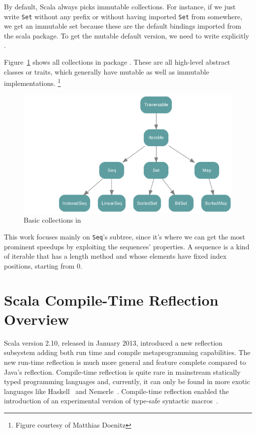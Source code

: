 By default, Scala always picks immutable collections. For instance, if we just
write \texttt{Set} without any prefix or without having imported \texttt{Set} from somewhere, we
get an immutable set because these are the default bindings imported from the scala
package. To get the mutable default version, we need to write explicitly
.

Figure~\ref{colls} shows all collections in package . These
are all high-level abstract classes or traits, which generally have mutable as
well as immutable implementations. \footnote{Figure courtesy of Matthias Doenitz}

\begin{figure}
\centering
\includegraphics{figures/colls.png}
\caption[All  collections]{Basic collections in 
}
\label{colls}
\end{figure}


This work focuses mainly on \texttt{Seq}'s subtree, since it's where we can get the
most prominent speedups by exploiting the sequences' properties. A sequence is a
kind of iterable that has a length method and whose elements have fixed index
positions, starting from 0.


\section{Scala Compile-Time Reflection Overview}

Scala version 2.10, released in January 2013, introduced a new reflection
subsystem adding both run time and compile metaprogramming capabilities. The new
run-time reflection is much more general and feature complete compared to Java's
reflection. Compile-time reflection is quite rare in mainstream statically typed
programming languages and, currently, it can only be found in more exotic
 languages like Haskell~\cite{sheard_template_2002} and Nemerle~\cite{nemerle:macros}.
 Compile-time reflection enabled the introduction of an experimental version of type-safe
 syntactic macros~\cite{burmako2012scala}. 


